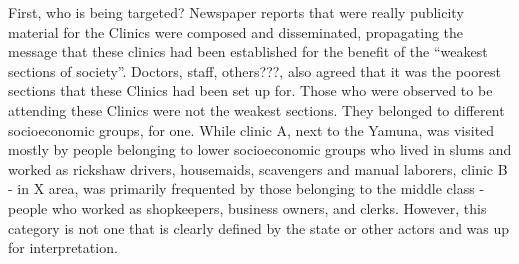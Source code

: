 First, who is being targeted? Newspaper reports that were really publicity material for the Clinics were composed and disseminated, propagating the message that these clinics had been established for the benefit of the ``weakest sections of society''. Doctors, staff, others???, also agreed that it was the poorest sections that these Clinics had been set up for. Those who were observed to be attending these Clinics were not the weakest sections. They belonged to different socioeconomic groups, for one. While clinic A, next to the Yamuna, was visited mostly by people belonging to lower socioeconomic groups who lived in slums and worked as rickshaw drivers, housemaids, scavengers and manual laborers, clinic B - in X area, was primarily frequented by those belonging to the middle class - people who worked as shopkeepers, business owners, and clerks. However, this category is not one that is clearly defined by the state or other actors and was up for interpretation. 

